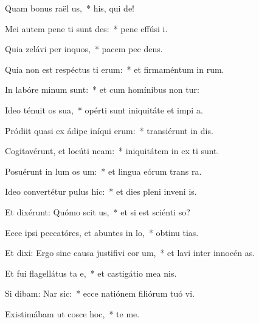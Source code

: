 \item Quam bonus raël us,~* his, qui   de!
\item Mei autem pene ti sunt des:~* pene effúsi   i.
\item Quia zelávi per inquos,~* pacem pec dens.
\item Quia non est respéctus ti erum:~* et firmaméntum in  rum.
\item In labóre minum  sunt:~* et cum homínibus non tur:
\item Ideo ténuit os sua,~* opérti sunt iniquitáte et impi a.
\item Pródiit quasi ex ádipe iníqui erum:~* transiérunt in  dis.
\item Cogitavérunt, et locúti  neam:~* iniquitátem in ex ti sunt.
\item Posuérunt in lum os um:~* et lingua eórum trans  ra.
\item Ideo convertétur pulus  hic:~* et dies pleni inveni  is.
\item Et dixérunt: Quómo scit us,~* et si est sciénti  so?
\item Ecce ipsi peccatóres, et abuntes in lo,~* obtinu tias.
\item Et dixi: Ergo sine causa justifivi cor um,~* et lavi inter innocén  as.
\item Et fui flagellátus ta e,~* et castigátio mea  nis.
\item Si dibam: Nar sic:~* ecce natiónem filiórum tuó vi.
\item Existimábam ut cosce hoc,~*   te me.
